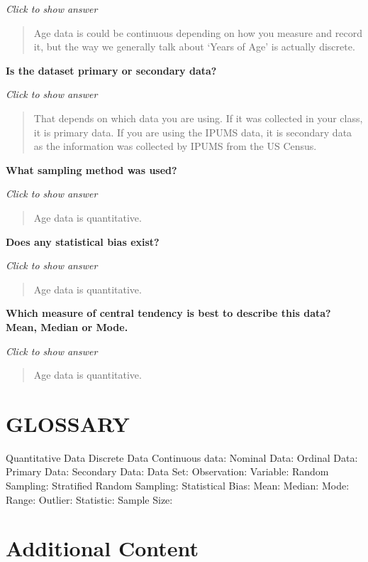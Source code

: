 \documentclass[
]{book}
\begin{document}
\emph{Click to show answer}

\begin{quote}
Age data is could be continuous depending on how you measure and record it,
but the way we generally talk about `Years of Age' is actually discrete.
\end{quote}

\textbf{Is the dataset primary or secondary data?}

\emph{Click to show answer}

\begin{quote}
That depends on which data you are using. If it was collected in your class, it is primary data. If you are using the IPUMS data, it is secondary data as the information was collected by IPUMS from the US Census.
\end{quote}

\textbf{What sampling method was used?}

\emph{Click to show answer}

\begin{quote}
Age data is quantitative.
\end{quote}

\textbf{Does any statistical bias exist?}

\emph{Click to show answer}

\begin{quote}
Age data is quantitative.
\end{quote}

\textbf{Which measure of central tendency is best to describe this data? Mean, Median or Mode.}

\emph{Click to show answer}

\begin{quote}
Age data is quantitative.
\end{quote}

\hypertarget{glossary}{%
\section{GLOSSARY}\label{glossary}}

Quantitative Data
Discrete Data
Continuous data:
Nominal Data:
Ordinal Data:
Primary Data:
Secondary Data:
Data Set:
Observation:
Variable:
Random Sampling:
Stratified Random Sampling:
Statistical Bias:
Mean:
Median:
Mode:
Range:
Outlier:
Statistic:
Sample Size:

\hypertarget{additional-content}{%
\section{Additional Content}\label{additional-content}}
\end{document}
